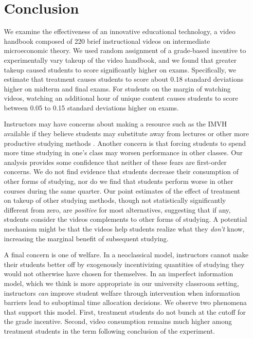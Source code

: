 \documentclass[12pt]{article}
\begin{document}
\section{Conclusion} \label{sec:conclusion}

We examine the effectiveness of an innovative educational technology, a video handbook composed of 220 brief instructional videos on intermediate microeconomic theory.
We used random assignment of a grade-based incentive to experimentally vary takeup of the video handbook, and we found that greater takeup caused students to score significantly higher on exams.
Specifically, we estimate that treatment causes students to score about 0.18 standard deviations higher on midterm and final exams.
For students on the margin of watching videos, watching an additional hour of unique content causes students to score between 0.05 to 0.15 standard deviations higher on exams.

Instructors may have concerns about making a resource such as the IMVH available if they believe students may substitute away from lectures or other more productive studying methods \textcite{kay2012}.
Another concern is that forcing students to spend more time studying in one's class may worsen performance in other classes.
Our analysis provides some confidence that neither of these fears are first-order concerns.
We do not find evidence that students decrease their consumption of other forms of studying, nor do we find that students perform worse in other courses during the same quarter.
Our point estimates of the effect of treatment on takeup of other studying methods, though not statistically significantly different from zero, are \textit{positive} for most alternatives, suggesting that if any, students consider the videos complements to other forms of studying.
A potential mechanism might be that the videos help students realize what they \textit{don't} know, increasing the marginal benefit of subsequent studying.

A final concern is one of welfare.
In a neoclassical model, instructors cannot make their students better off by exogenously incentivizing quantities of studying they would not otherwise have chosen for themselves.
In an imperfect information model, which we think is more appropriate in our university classroom setting, instructors \textit{can} improve student welfare through intervention when information barriers lead to suboptimal time allocation decisions.
We observe two phenomena that support this model.
First, treatment students do not bunch at the cutoff for the grade incentive.
Second, video consumption remains much higher among treatment students in the term following conclusion of the experiment.
\end{document}
